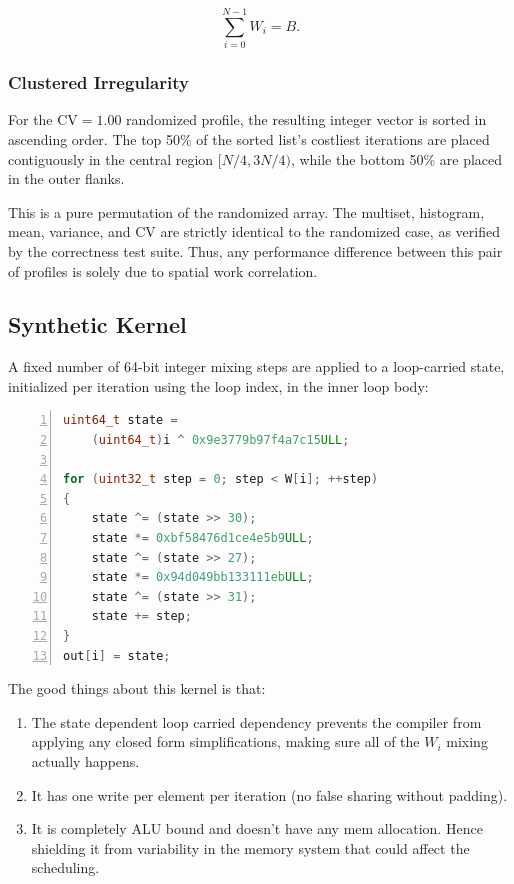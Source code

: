 \documentclass[conference]{IEEEtran}
\begin{document}
\[
\sum_{i=0}^{N-1} W_i = B.
\]

\subsubsection{Clustered Irregularity}

For the \(\mathrm{CV} = 1.00\) randomized profile, the resulting integer vector is sorted in ascending order. The top 50\% of the sorted list's costliest iterations are placed contiguously in the central region \([N/4, 3N/4)\), while the bottom 50\% are placed in the outer flanks.

This is a pure permutation of the randomized array. The multiset, histogram, mean, variance, and CV are strictly identical to the randomized case, as verified by the correctness test suite. Thus, any performance difference between this pair of profiles is solely due to spatial work correlation.

\subsection{Synthetic Kernel}

A fixed number of 64-bit integer mixing steps are applied to a loop-carried state, initialized per iteration using the loop index, in the inner loop body:

\begin{lstlisting}[language=C++,
    caption={Synthetic hash kernel executed W[i] times per iteration.},
    basicstyle=\ttfamily\small,
    numbers=left,
    frame=single]
uint64_t state =
    (uint64_t)i ^ 0x9e3779b97f4a7c15ULL;

for (uint32_t step = 0; step < W[i]; ++step)
{
    state ^= (state >> 30);
    state *= 0xbf58476d1ce4e5b9ULL;
    state ^= (state >> 27);
    state *= 0x94d049bb133111ebULL;
    state ^= (state >> 31);
    state += step;
}
out[i] = state;
\end{lstlisting}

The good things about this kernel is that:

\begin{enumerate}
    \item The state dependent loop carried dependency prevents the compiler from applying any closed form simplifications, making sure all of the $W_i$ mixing actually happens.

    \item It has one write per element per iteration (no false sharing without padding).

    \item It is completely ALU bound and doesn't have any mem allocation. Hence shielding it from variability in the memory system that could affect the scheduling.
\end{enumerate}
\end{document}
